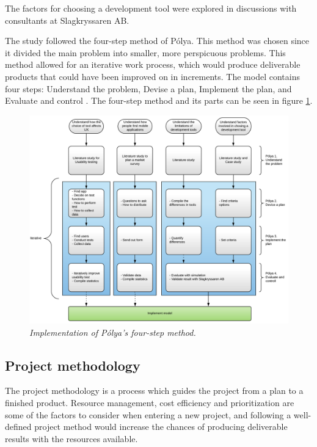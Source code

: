 The factors for choosing a development tool were explored in discussions with consultants at Slagkryssaren AB. 

The study followed the four-step method of Pólya. This method was chosen since it divided the main problem into smaller, more perspicuous problems. This method allowed for an iterative work process, which would produce deliverable products that could have been improved on in increments. The model contains four steps: Understand the problem, Devise a plan, Implement the plan, and Evaluate and control \cite{PolyaPDF}.
The four-step method and its parts can be seen in figure \ref{fig:project-polya}.

\begin{figure}[ht]
    \centering 
    \includegraphics[width=1\textwidth]{img/polya2.png}
    \hfill
    \caption{\textit{Implementation of Pólya's four-step method.}}
        \label{fig:project-polya}
\end{figure}

\subsection{Project methodology}

The project methodology is a process which guides the project from a plan to a finished product. Resource management, cost efficiency and prioritization are some of the factors to consider when entering a new project, and following a well-defined project method would increase the chances of producing deliverable results with the resources available. 

